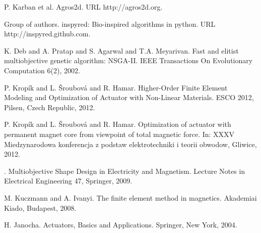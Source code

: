 \documentclass[article, A4, 11pt]{llncs}%
\begin{document}

\begin{thebibliography}{10}
{\sc P. Karban et al}. {Agros2d}. URL http://agros2d.org.

{\sc Group of authors}. {inspyred: Bio-inspired algorithms in python}. URL http://inspyred.github.com.

{\sc K. Deb and A. Pratap and S. Agarwal and T.A. Meyarivan}. {Fast and elitist multiobjective genetic algorithm: NSGA-II}. IEEE Transactions On Evolutionary Computation 6(2), 2002.

{\sc P. Krop\'{i}k and L. \v{S}roubov\'{a} and R. Hamar}. {Higher-Order Finite Element Modeling and Optimization of Actuator with Non-Linear Materials}. ESCO 2012, Pilsen, Czech Republic, 2012.

{\sc P. Krop\'{i}k and L. \v{S}roubov\'{a} and R. Hamar}. {Optimization of actuator with permanent magnet core from viewpoint of total magnetic force}. In: XXXV Miedzynarodowa konferencja z podstaw elektrotechniki i teorii obwodow, Gliwice, 2012.

{}. {Multiobjective Shape Design in Electricity and Magnetism}. Lecture Notes in Electrical Engineering 47, Springer, 2009.

{\sc M. Kuczmann and A. Ivanyi}. {The finite element method in magnetics}. Akademiai Kiado, Budapest, 2008.

{\sc H. Janocha}. {Actuators, Basics and Applications}. Springer, New York, 2004.
\end{thebibliography} %
\end{document}
